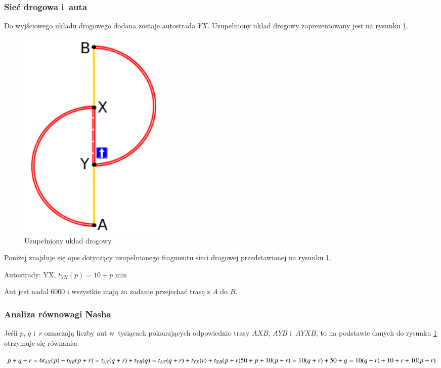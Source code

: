 \documentclass[twoside,12pt]{report}
\begin{document}
\subsubsection{Sieć drogowa i~auta}
Do wyjściowego układu drogowego dodana zostaje autostrada $YX$. Uzupełniony układ drogowy zaprezentowany jest na rysunku \ref{fig:wyjsciowy_uklad_drogowy2}.

\begin{figure}[ht]
	\centering
	\includegraphics[width=0.35\textwidth]{img/braess2}
	\caption{Uzupełniony układ drogowy}
	\label{fig:wyjsciowy_uklad_drogowy2}
\end{figure}

Poniżej znajduje się opis dotyczący uzupełnionego fragmentu sieci drogowej przedstawionej na rysunku \ref{fig:wyjsciowy_uklad_drogowy2}.

Autostrady:\newline
YX, $t_{YX}(p) =  10 + p$ min\newline

Aut jest nadal 6000 i wszystkie mają za zadanie przejechać trasę z $A$ do $B$.

\subsubsection{Analiza równowagi Nasha}

Jeśli $p$, $q$ i~$r$ oznaczają liczby aut w~tysiącach pokonujących odpowiednio trasy $AXB$, $AYB$ i~$AYXB$, to na podstawie danych do rysunku \ref{fig:wyjsciowy_uklad_drogowy2} otrzymuje się równania:

\begin{center}
\begin{math}
p+q+r = 6 \newline
t_{AX}(p)+t_{XB}(p+r) = t_{AY}(q+r) + t_{YB}(q) = t_{AY}(q+r)+t_{YX}(r)+t_{XB}(p+r)\newline
50+p+10(p+r) = 10(q+r)+50+q = 10(q+r)+ 10 + r + 10(p+r)\newline
\end{math}
\end{center}
\end{document}
